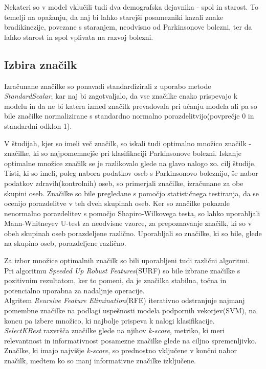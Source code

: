 \documentclass[
]{article}
\begin{document}
Nekateri so v model vklučili tudi dva demografska dejavnika - spol in
starost. To temelji na opažanju, da naj bi lahko starejši posamezniki
kazali znake bradikinezije, povezane s staranjem, neodvisno od
Parkinsonove bolezni, ter da lahko starost in spol vplivata na razvoj
bolezni.

\subsection{Izbira značilk}\label{izbira-znaux10dilk}

Izračunane značilke so ponavadi standardizirali z uporabo metode
\emph{StandardScalar}, kar naj bi zagotvaljalo, da vse značilke enako
prispevajo k modelu in da ne bi katera izmed značilk prevadovala pri
učanju modela ali pa so bile značilke normalizirane s standardno
normalno porazdelitvijo(povprečje 0 in standardni odklon 1).

V študijah, kjer so imeli več značilk, so iskali tudi optimalno množico
značilk - značilke, ki so najpomemnejše pri klasifikaciji Parkinsonove
bolezni. Iskanje optimalne množice značilk se je razlikovalo glede na
glavo nalogo zo. cilj študije. Tisti, ki so imeli, poleg nabora podatkov
oseb s Parkinsonovo boleznijo, še nabor podatkov zdravih(kontrolnih)
oseb, so primerjali značilke, izračunane za obe skupini oseb. Značilke
so bile pregledane s pomočjo statističnega testiranja, da se ocenijo
porazdelitve v teh dveh skupinah oseb. Ker so značilke pokazale
nenormalno porazdelitev s pomočjo Shapiro-Wilkovega testa, so lahko
uporabljali Mann-Whitneyev U-test za neodvisne vzorce, za prepoznavanje
značilk, ki so v obeh skupinah oseb porazdeljene različno. Uporabljali
so značilke, ki so bile, glede na skupino oseb, porazdeljene različno.

Za izbor množice optimalnih značilk so bili uporabljeni tudi različni
algoritmi.\\
Pri algoritmu \emph{Speeded Up Robust Features}(SURF) so bile izbrane
značilke s pozitivnim rezultatom, ker to pomeni, da je značilka
stabilna, točna in potencialno uporabna za nadaljnje operacije.\\
Algritem \emph{Reursive Feature Elimination}(RFE) iterativno odstranjuje
najmanj pomembne značilke na podlagi uspešnosti modela podpornih
vekorjev(SVM), na koncu pa izbere množico, ki najbolje prispeva k nalogi
klasifikacije.\\
\emph{SelectKBest} razvršča značilke glede na njihov \emph{k-score},
metriko, ki meri relevantnost in informativnost posamezne značilke glede
na ciljno spremenljivko. Značlke, ki imajo najvišje \emph{k-score}, so
prednostno vključene v končni nabor značilk, medtem ko so manj
informativne značilke izključene.\\
\end{document}
